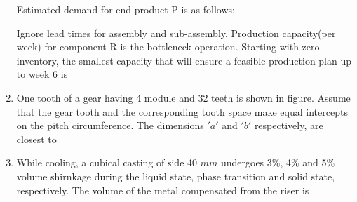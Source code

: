 \documentclass[journal]{IEEEtran}
\numberwithin{equation}{enumi}
\numberwithin{figure}{enumi}
\begin{document}
\begin{enumerate}

Estimated demand for end product P is as follows: 


\begin{table}[!ht]
  \centering
  

\end{table}

Ignore lead times for assembly and sub-assembly. Production capacity(per week)
for component R is the bottleneck operation. Starting with zero inventory, the smallest capacity that will ensure a feasible production plan up to week 6 is
\hfill{}
\begin{enumerate}
\end{enumerate}
\item One tooth of a gear having 4 module and 32 teeth is shown in figure. Assume that the gear tooth and the corresponding tooth space make equal intercepts on the pitch circumference. The dimensions $'a'$ and $'b'$ respectively, are closest to
\hfill{}


\begin{enumerate}
    
\end{enumerate}
\item While cooling, a cubical casting of side 40 $mm$ undergoes 3\%, 4\% and 5\% volume shirnkage during the liquid state, phase transition and solid state, respectively. The volume of the metal compensated from the riser is
\hfill{}
\begin{enumerate}
   

\end{enumerate}
\end{enumerate}
\end{document}
